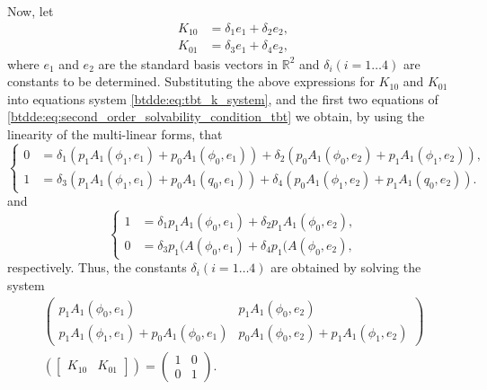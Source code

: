 Now, let
\begin{align*}
K_{10} & = \delta_1e_1 + \delta_2e_2,\\
K_{01} & = \delta_3e_1 + \delta_4e_2,
\end{align*}
where $e_1$ and $e_2$ are the standard basis vectors in $\mathbb R^2$ and
$\delta_i(i = 1\dots4)$ are constants to be determined. Substituting the above
expressions for $K_{10}$ and $K_{01}$ into equations system
\cref{btdde:eq:tbt_k_system}, and the first two equations of
\cref{btdde:eq:second_order_solvability_condition_tbt} we obtain, by using the
linearity of the multi-linear forms, that
\begin{equation}
\begin{cases}
0 & = \delta_1\left(p_1A_1(\phi_1,e_1) + p_0A_1(\phi_0,e_1)\right) + \delta_2\left(p_0A_1(\phi_0,e_2) + p_1A_1(\phi_1,e_2)\right),\\
1 & = \delta_3\left(p_1A_1(\phi_1,e_1) + p_0A_1(q_0,e_1)\right) + \delta_4\left(p_0A_1(\phi_1,e_2) + p_1A_1(q_0,e_2)\right).
\end{cases}
\end{equation}
and
\begin{equation}
\begin{cases}
1 & = \delta_1p_1A_1(\phi_0,e_1) + \delta_2p_1A_1(\phi_0,e_2),\\
0 & = \delta_3p_1(A(\phi_0,e_1) + \delta_4p_1(A(\phi_0,e_2),
\end{cases}
\end{equation}
respectively. Thus, the constants $\delta_i(i = 1\dots4)$ are obtained
by solving the system
\begin{multline*}
\left(\begin{array}{cc}
p_1A_1(\phi_0,e_1) & p_1A_1(\phi_0,e_2)\\
p_1A_1(\phi_1,e_1) + p_0A_1(\phi_0,e_1) & p_0A_1(\phi_0,e_2) + p_1A_1(\phi_1,e_2)
\end{array}\right)\\
\left(\left[\begin{array}{cc}
K_{10} & K_{01}\end{array}\right]\right) = \left(\begin{array}{cc}
1 & 0\\
0 & 1
\end{array}\right).
\end{multline*}

